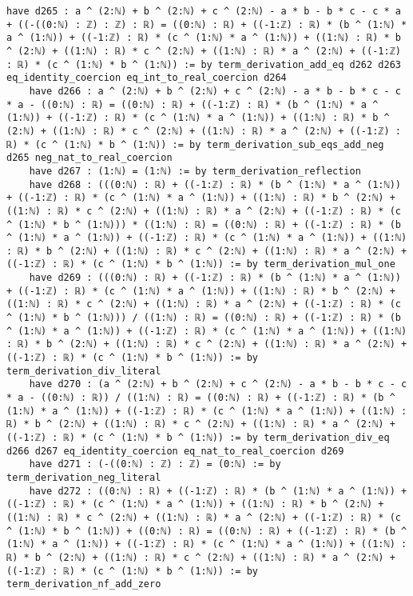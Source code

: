 \documentclass{article}
\begin{document}
\begin{tcolorbox}[colback=white!10, width=\linewidth]
\begin{lstlisting}[language=Lean4]
    have d265 : a ^ (2:ℕ) + b ^ (2:ℕ) + c ^ (2:ℕ) - a * b - b * c - c * a + ((-((0:ℕ) : ℤ) : ℤ) : ℝ) = ((0:ℕ) : ℝ) + ((-1:ℤ) : ℝ) * (b ^ (1:ℕ) * a ^ (1:ℕ)) + ((-1:ℤ) : ℝ) * (c ^ (1:ℕ) * a ^ (1:ℕ)) + ((1:ℕ) : ℝ) * b ^ (2:ℕ) + ((1:ℕ) : ℝ) * c ^ (2:ℕ) + ((1:ℕ) : ℝ) * a ^ (2:ℕ) + ((-1:ℤ) : ℝ) * (c ^ (1:ℕ) * b ^ (1:ℕ)) := by term_derivation_add_eq d262 d263 eq_identity_coercion eq_int_to_real_coercion d264
    have d266 : a ^ (2:ℕ) + b ^ (2:ℕ) + c ^ (2:ℕ) - a * b - b * c - c * a - ((0:ℕ) : ℝ) = ((0:ℕ) : ℝ) + ((-1:ℤ) : ℝ) * (b ^ (1:ℕ) * a ^ (1:ℕ)) + ((-1:ℤ) : ℝ) * (c ^ (1:ℕ) * a ^ (1:ℕ)) + ((1:ℕ) : ℝ) * b ^ (2:ℕ) + ((1:ℕ) : ℝ) * c ^ (2:ℕ) + ((1:ℕ) : ℝ) * a ^ (2:ℕ) + ((-1:ℤ) : ℝ) * (c ^ (1:ℕ) * b ^ (1:ℕ)) := by term_derivation_sub_eqs_add_neg d265 neg_nat_to_real_coercion
    have d267 : (1:ℕ) = (1:ℕ) := by term_derivation_reflection
    have d268 : (((0:ℕ) : ℝ) + ((-1:ℤ) : ℝ) * (b ^ (1:ℕ) * a ^ (1:ℕ)) + ((-1:ℤ) : ℝ) * (c ^ (1:ℕ) * a ^ (1:ℕ)) + ((1:ℕ) : ℝ) * b ^ (2:ℕ) + ((1:ℕ) : ℝ) * c ^ (2:ℕ) + ((1:ℕ) : ℝ) * a ^ (2:ℕ) + ((-1:ℤ) : ℝ) * (c ^ (1:ℕ) * b ^ (1:ℕ))) * ((1:ℕ) : ℝ) = ((0:ℕ) : ℝ) + ((-1:ℤ) : ℝ) * (b ^ (1:ℕ) * a ^ (1:ℕ)) + ((-1:ℤ) : ℝ) * (c ^ (1:ℕ) * a ^ (1:ℕ)) + ((1:ℕ) : ℝ) * b ^ (2:ℕ) + ((1:ℕ) : ℝ) * c ^ (2:ℕ) + ((1:ℕ) : ℝ) * a ^ (2:ℕ) + ((-1:ℤ) : ℝ) * (c ^ (1:ℕ) * b ^ (1:ℕ)) := by term_derivation_mul_one
    have d269 : (((0:ℕ) : ℝ) + ((-1:ℤ) : ℝ) * (b ^ (1:ℕ) * a ^ (1:ℕ)) + ((-1:ℤ) : ℝ) * (c ^ (1:ℕ) * a ^ (1:ℕ)) + ((1:ℕ) : ℝ) * b ^ (2:ℕ) + ((1:ℕ) : ℝ) * c ^ (2:ℕ) + ((1:ℕ) : ℝ) * a ^ (2:ℕ) + ((-1:ℤ) : ℝ) * (c ^ (1:ℕ) * b ^ (1:ℕ))) / ((1:ℕ) : ℝ) = ((0:ℕ) : ℝ) + ((-1:ℤ) : ℝ) * (b ^ (1:ℕ) * a ^ (1:ℕ)) + ((-1:ℤ) : ℝ) * (c ^ (1:ℕ) * a ^ (1:ℕ)) + ((1:ℕ) : ℝ) * b ^ (2:ℕ) + ((1:ℕ) : ℝ) * c ^ (2:ℕ) + ((1:ℕ) : ℝ) * a ^ (2:ℕ) + ((-1:ℤ) : ℝ) * (c ^ (1:ℕ) * b ^ (1:ℕ)) := by term_derivation_div_literal
    have d270 : (a ^ (2:ℕ) + b ^ (2:ℕ) + c ^ (2:ℕ) - a * b - b * c - c * a - ((0:ℕ) : ℝ)) / ((1:ℕ) : ℝ) = ((0:ℕ) : ℝ) + ((-1:ℤ) : ℝ) * (b ^ (1:ℕ) * a ^ (1:ℕ)) + ((-1:ℤ) : ℝ) * (c ^ (1:ℕ) * a ^ (1:ℕ)) + ((1:ℕ) : ℝ) * b ^ (2:ℕ) + ((1:ℕ) : ℝ) * c ^ (2:ℕ) + ((1:ℕ) : ℝ) * a ^ (2:ℕ) + ((-1:ℤ) : ℝ) * (c ^ (1:ℕ) * b ^ (1:ℕ)) := by term_derivation_div_eq d266 d267 eq_identity_coercion eq_nat_to_real_coercion d269
    have d271 : (-((0:ℕ) : ℤ) : ℤ) = (0:ℕ) := by term_derivation_neg_literal
    have d272 : ((0:ℕ) : ℝ) + ((-1:ℤ) : ℝ) * (b ^ (1:ℕ) * a ^ (1:ℕ)) + ((-1:ℤ) : ℝ) * (c ^ (1:ℕ) * a ^ (1:ℕ)) + ((1:ℕ) : ℝ) * b ^ (2:ℕ) + ((1:ℕ) : ℝ) * c ^ (2:ℕ) + ((1:ℕ) : ℝ) * a ^ (2:ℕ) + ((-1:ℤ) : ℝ) * (c ^ (1:ℕ) * b ^ (1:ℕ)) + ((0:ℕ) : ℝ) = ((0:ℕ) : ℝ) + ((-1:ℤ) : ℝ) * (b ^ (1:ℕ) * a ^ (1:ℕ)) + ((-1:ℤ) : ℝ) * (c ^ (1:ℕ) * a ^ (1:ℕ)) + ((1:ℕ) : ℝ) * b ^ (2:ℕ) + ((1:ℕ) : ℝ) * c ^ (2:ℕ) + ((1:ℕ) : ℝ) * a ^ (2:ℕ) + ((-1:ℤ) : ℝ) * (c ^ (1:ℕ) * b ^ (1:ℕ)) := by term_derivation_nf_add_zero

\end{lstlisting}
\end{tcolorbox}
\end{document}
